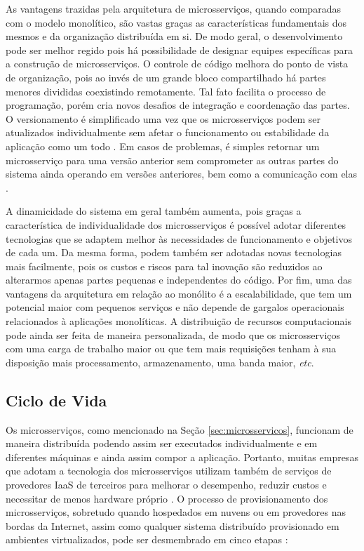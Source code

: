 As vantagens trazidas pela arquitetura de microsserviços, quando comparadas com o modelo monolítico, são vastas graças as características fundamentais dos mesmos e da organização distribuída em si.
%
De modo geral, o desenvolvimento pode ser melhor regido pois há possibilidade de designar equipes específicas para a construção  de microsserviços.
%
O controle de código melhora do ponto de vista de organização, pois ao invés de um grande bloco compartilhado há partes menores divididas coexistindo remotamente. Tal fato facilita o processo de programação, porém cria novos desafios de integração e coordenação das partes. 
%
O versionamento é simplificado uma vez que os microsserviços podem ser atualizados individualmente sem afetar o funcionamento ou estabilidade da aplicação como um todo \cite{microsservicos:artigo_microsservicos}. Em casos de problemas, é simples retornar um microsserviço para uma versão anterior sem comprometer as outras partes do sistema ainda operando em versões anteriores, bem como a comunicação com elas \cite{microsservicos:newman_microsservicos}.

%
A dinamicidade do sistema em geral também aumenta, pois graças a característica de individualidade dos microsserviços é possível adotar diferentes tecnologias que se adaptem melhor às necessidades de funcionamento e objetivos de cada um.
%
Da mesma forma, podem também ser adotadas novas tecnologias mais facilmente, pois os custos e riscos para tal inovação são reduzidos ao alterarmos apenas partes pequenas e independentes do código. 
%
Por fim, uma das vantagens da arquitetura em relação ao monólito é a escalabilidade, que tem um potencial maior com pequenos serviços e não depende de  gargalos operacionais relacionados à aplicações monolíticas. A distribuição de recursos computacionais pode ainda ser feita de maneira personalizada, de modo que os microsserviços com uma carga de trabalho maior ou que tem mais requisições tenham à sua disposição mais processamento, armazenamento, uma banda maior, \textit{etc}.


\subsection{Ciclo de Vida}

Os microsserviços, como mencionado na Seção \ref{sec:microsservicos}, funcionam de maneira distribuída podendo assim ser executados individualmente e em diferentes máquinas e ainda assim compor a aplicação. Portanto, muitas empresas que adotam a tecnologia dos microsserviços utilizam também de serviços de provedores \ac{IaaS} de terceiros para melhorar o desempenho, reduzir custos e necessitar de menos hardware próprio \cite{microsservicos:empresas, microsservicos:alocacao}. O processo de provisionamento dos microsserviços, sobretudo quando hospedados em nuvens ou em provedores nas bordas da Internet, assim como qualquer sistema distribuído provisionado em ambientes virtualizados, pode ser desmembrado em cinco etapas \cite{nuvem_sla:tese_guilherme}: 

